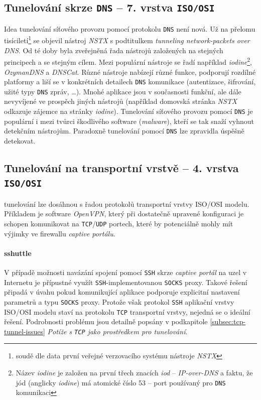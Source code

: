 \documentclass[thesis=M,czech]{FITthesis}[2012/10/20]
\begin{document}
\subsection{Tunelování skrze \texttt{DNS} -- 7. vrstva \texttt{ISO/OSI}}

Idea tunelování síťového provozu pomocí protokolu \texttt{DNS} není nová. Už na přelomu tisíciletí\footnote{soudě dle data první veřejné verzovacího systému nástroje \textit{NSTX}} se objevil nástroj \textit{NSTX} s podtitulkem \textit{tunneling network-packets over DNS}. Od té doby byla zveřejněná řada nástrojů založených na stejných principech a se stejným cílem. Mezi populární\cite{sans-dns-tunels} nástroje se řadí například \textit{iodine}\footnote{Název \textit{iodine} je založen na první třech znacích \textit{iod} -- \textit{IP-over-DNS} a faktu, že jód (anglicky \textit{iodine}) má atomické číslo 53 -- port používaný pro \texttt{DNS} komunikaci}, \textit{OzymanDNS} a \textit{DNSCat}. Různé nástroje nabízejí různé funkce, podporují rozdílné platformy a liší se v konkrétních detailech \texttt{DNS} komunikace (autentizace, šifrování, užité typy \texttt{DNS} zpráv, \ldots). Mnohé aplikace jsou v současnosti funkční, ale dále nevyvíjené ve prospěch jiných nástrojů (například domovská stránka \textit{NSTX} odkazuje zájemce na stránky \textit{iodine}). Tunelování síťového provozu pomocí \texttt{DNS} je populární\cite{sans-dns-tunels} i mezi tvůrci škodlivého software (\textit{malware}), kteří se tak snaží vyhnout detekčním nástrojům. Paradoxně tunelování pomocí \texttt{DNS} lze zpravidla úspěšně detekovat\cite{bakalarka-detekce-tunelu}.


\subsection{Tunelování na transportní vrstvě -- 4. vrstva \texttt{ISO/OSI}}

 tunelování lze dosáhnou s řadou protokolů transportní vrstvy ISO/OSI modelu. Příkladem je software \textit{OpenVPN}, který při dostatečně upravené konfiguraci je schopen komunikovat na \texttt{TCP}/\texttt{UDP} portech, které by potenciálně mohly mít výjimky ve firewallu \textit{captive portálu}.

\paragraph{sshuttle}

V případě možnosti navázání spojení pomocí \texttt{SSH} skrze \textit{captive portál} na uzel v Internetu je přípustné využít \texttt{SSH}-implementovanou \texttt{SOCKS} proxy. Takové řešení připadá v úvahu pokud komunikující aplikace podporuje explicitní nastavení parametrů a typu \texttt{SOCKS} proxy. Protože však protokol \texttt{SSH} aplikační vrstvy ISO/OSI modelu staví na protokolu \texttt{TCP} transportní vrstvy, nejedná se o ideální řešení. Podrobnosti problému jsou detailně popsány v podkapitole \ref{subsec:tcp-tunnel-issues} \textit{Potíže s \texttt{TCP} jako prostředkem pro tunelování}.
\end{document}
